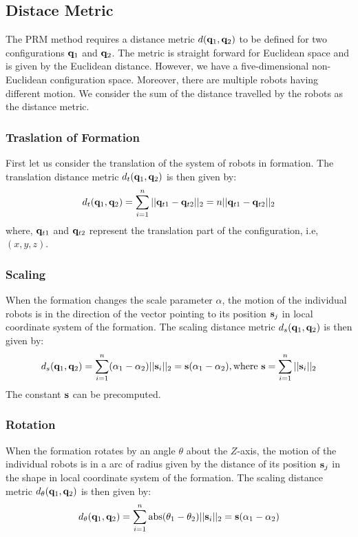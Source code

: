 \documentclass[12pt,a4paper, onecolumn]{IEEEtran}
\begin{document}
\subsection{Distace Metric}
The PRM method requires a distance metric $d(\mathbf{q}_1, \mathbf{q}_2)$ to be defined for two configurations $\mathbf{q}_1$ and $\mathbf{q}_2$. The metric is straight forward for Euclidean space and is given by the Euclidean distance. However, we have a five-dimensional non-Euclidean configuration space. Moreover, there are multiple robots having different motion. We consider the sum of the distance travelled by the robots as the distance metric.
\subsubsection{Traslation of Formation}
First let us consider the translation of the system of robots in formation. The translation distance metric $d_t(\mathbf{q}_1, \mathbf{q}_2)$ is then given by:
\begin{equation}
d_t(\mathbf{q}_1, \mathbf{q}_2) = \sum_{i = 1}^{n} ||\mathbf{q}_{t1} - \mathbf{q}_{t2}||_2 = n||\mathbf{q}_{t1} - \mathbf{q}_{t2}||_2
  \label{eqn:dt}
\end{equation}
where, $\mathbf{q}_{t1}$ and $\mathbf{q}_{t2}$ represent the translation part of the configuration, i.e, $(x, y, z)$.

\subsubsection{Scaling}
When the formation changes the scale parameter $\alpha$, the motion of the individual robots is in the direction of the vector pointing to its position $\mathbf{s}_j$ in local coordinate system of the formation. The scaling distance metric $d_s(\mathbf{q}_1, \mathbf{q}_2)$ is then given by:
\begin{equation}
  d_s(\mathbf{q}_1, \mathbf{q}_2) = \sum_{i=1}^n (\alpha_1 - \alpha_2) ||\mathbf{s}_i||_2 = \mathbf{s} (\alpha_1 - \alpha_2), \text {where } \mathbf{s} = \sum_{i=1}^n ||\mathbf{s}_i||_2
  \label{eqn:ds}
\end{equation}
The constant $\mathbf{s}$ can be precomputed.

\subsubsection{Rotation}
When the formation rotates by an angle $\theta$ about the $Z$-axis, the motion of the individual robots is in a arc of radius given by the distance of its position $\mathbf{s}_j$  in the shape in local coordinate system of the formation. The scaling distance metric $d_\theta(\mathbf{q}_1, \mathbf{q}_2)$ is then given by:
\begin{equation}
  d_\theta(\mathbf{q}_1, \mathbf{q}_2) = \sum_{i=1}^n \operatorname{abs}(\theta_1 - \theta_2) ||\mathbf{s}_i||_2 = \mathbf{s} (\alpha_1 - \alpha_2) 
  \label{eqn:dth}
\end{equation}
\end{document}
